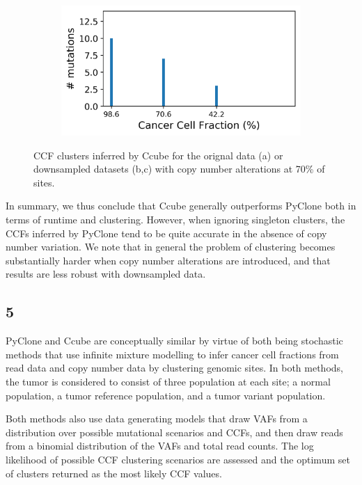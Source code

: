\documentclass{article}
\begin{document}
\begin{figure}[h]
\begin{subfigure}[t]{0.32\linewidth}
	\end{subfigure}%
	\hspace{0.01 \linewidth}
	\begin{subfigure}[t]{0.32\linewidth}
		\centering
		\includegraphics[width = 1.0\linewidth, trim={0 0 0 0}, clip=true]{ccube_analysis_7CN_20/cols.png}
	\end{subfigure}%
\caption{CCF clusters inferred by Ccube for the orignal data (a) or downsampled datasets (b,c) with copy number alterations at 70\% of sites.}
\label{fig:CN7}
\end{figure}
\newpage
In summary, we thus conclude that Ccube generally outperforms PyClone both in terms of runtime and clustering. However, when ignoring singleton clusters, the CCFs inferred by PyClone tend to be quite accurate in the absence of copy number variation. We note that in general the problem of clustering becomes substantially harder when copy number alterations are introduced, and that results are less robust with downsampled data.

\subsection*{5}

PyClone and Ccube are conceptually similar by virtue of both being stochastic methods that use infinite mixture modelling to infer cancer cell fractions from read data and copy number data by clustering genomic sites. In both methods, the tumor is considered to consist of three population at each site; a normal population, a tumor reference population, and a tumor variant population.

Both methods also use data generating models that draw VAFs from a distribution over possible mutational scenarios and CCFs, and then draw reads from a binomial distribution of the VAFs and total read counts. The log likelihood of possible CCF clustering scenarios are assessed and the optimum set of clusters returned as the most likely CCF values.
\end{document}
